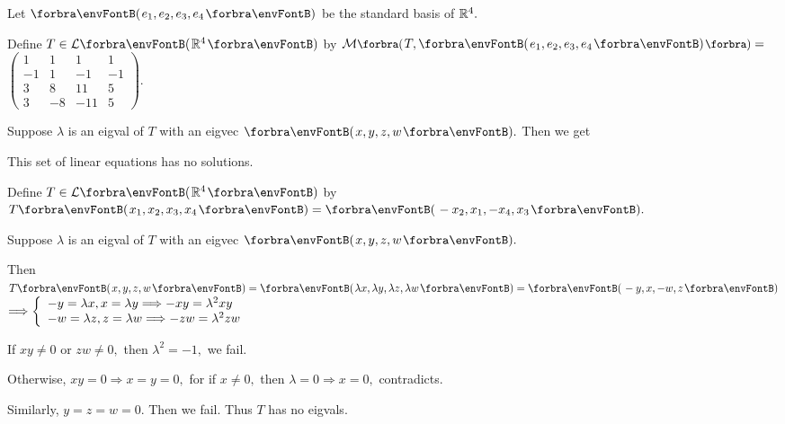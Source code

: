 \documentclass[a4paper, 11pt, UTF8]{article}
\begin{document}
\begin{large}
\par\quad
Let $\Par{e_1,e_2,e_3,e_4}$ be the standard basis of $\Rbb^4.$\vspace{-6pt}\par\quad
Define $T\in\Lm{\Rbb^4}$ by $\Mt[\BigPar]{T,\Par{e_1,e_2,e_3,e_4}}={}${\normalsize$\begin{pmatrix}
		1 & 1 & 1 & 1\\
		-1 & 1 & -1 & -1\\
		3 & 8 & 11 & 5\\
		3 & -8 & -11 & 5
	\end{pmatrix}.$}\vspace{-12pt}\par\quad
Suppose $\lambda$ is an eigval of $T$ with an eigvec $\Par{x,y,z,w}.$ Then we get \vspace{-8pt}\par\quad
This set of linear equations has no solutions.\par\quad
{}\large\par\vspace{6pt}\quad
\Or Define $T\in\Lm{\Rbb^4}$ by $T\Par{x_1,x_2,x_3,x_4}=\Par{-x_2,x_1,-x_4,x_3}.$\par\quad
Suppose $\lambda$ is an eigval of $T$ with an eigvec $\Par{x,y,z,w}.$\vspace{-3pt}\par\quad
Then $T\Par{x,y,z,w}=\Par{\lambda x,\lambda y,\lambda z,\lambda w}=\Par{-y,x,-w,z}$ { $\Longrightarrow\MathLeftBrace{l}{
		-y=\lambda x,x=\lambda y\Longrightarrow-xy=\lambda^2 xy\\
		-w=\lambda z,z=\lambda w\Longrightarrow-zw=\lambda^2 zw}$}\vspace{-3pt}\par\quad
If $xy\neq 0$ or $zw\neq 0,$ then $\lambda^2=-1,$ we fail.\par\quad
Otherwise, $xy=0\Rightarrow x=y=0,$ for if $x\neq 0,$ then $\lambda=0\Rightarrow x=0,$ contradicts.\par\quad
Similarly, $y=z=w=0.$ Then we fail. Thus $T$ has no eigvals.\PfEnd
\SepLine


\end{large}
\end{document}
